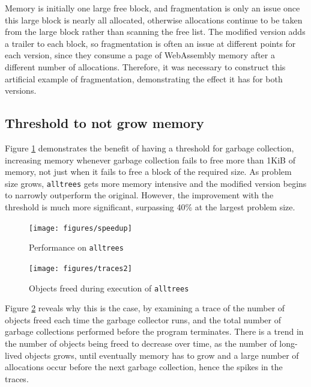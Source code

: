 Memory is initially one large free block, and fragmentation is only an issue once this large block is nearly all allocated, otherwise allocations continue to be taken from the large block rather than scanning the free list. The modified version adds a trailer to each block, so fragmentation is often an issue at different points for each version, since they consume a page of WebAssembly memory after a different number of allocations. Therefore, it was necessary to construct this artificial example of fragmentation, demonstrating the effect it has for both versions.

\subsection{Threshold to not grow memory}

Figure \ref{fig:speedup} demonstrates the benefit of having a threshold for garbage collection, increasing memory whenever garbage collection fails to free more than 1KiB of memory, not just when it fails to free a block of the required size. As problem size grows, \verb|alltrees| gets more memory intensive and the modified version begins to narrowly outperform the original. However, the improvement with the threshold is much more significant, surpassing 40\% at the largest problem size.

\begin{figure}[H]
\hfill \texttt{[image: figures/speedup]} \hfill
\vspace{-0.2cm}
\cprotect\caption{Performance on \verb|alltrees|}
 \label{fig:speedup} 
\end{figure}


\begin{figure}[H]
\hfill \texttt{[image: figures/traces2]} \hfill
\vspace{-0.8cm}
\caption{Objects freed during execution of \texttt{alltrees}}
 \label{fig:traces} 
\end{figure}

Figure \ref{fig:traces} reveals why this is the case, by examining a trace of the number of objects freed each time the garbage collector runs, and the total number of garbage collections performed before the program terminates. There is a trend in the number of objects being freed to decrease over time, as the number of long-lived objects grows, until eventually memory has to grow and a large number of allocations occur before the next garbage collection, hence the spikes in the traces. 

